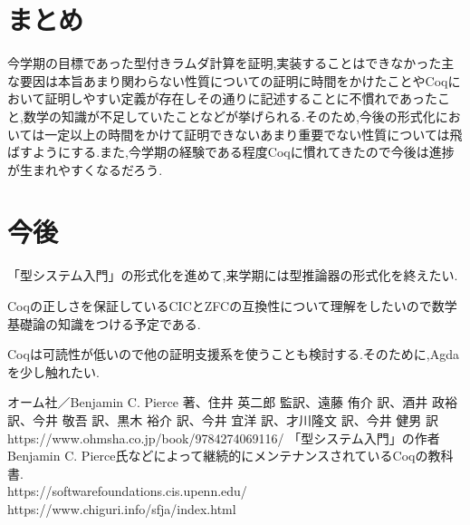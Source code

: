 \documentclass[fleqn,a4j,10pt]{jsarticle}
\begin{document}
\section{まとめ}
今学期の目標であった型付きラムダ計算を証明,実装することはできなかった主な要因は本旨あまり関わらない性質についての証明に時間をかけたことやCoqにおいて証明しやすい定義が存在しその通りに記述することに不慣れであったこと,数学の知識が不足していたことなどが挙げられる.そのため,今後の形式化においては一定以上の時間をかけて証明できないあまり重要でない性質については飛ばすようにする.また,今学期の経験である程度Coqに慣れてきたので今後は進捗が生まれやすくなるだろう.

\section{今後}
「型システム入門」の形式化を進めて,来学期には型推論器の形式化を終えたい.\par
Coqの正しさを保証しているCICとZFCの互換性について理解をしたいので数学基礎論の知識をつける予定である.\par
Coqは可読性が低いので他の証明支援系を使うことも検討する.そのために,Agdaを少し触れたい.\par

\begin{thebibliography}{}
 オーム社／Benjamin C. Pierce 著、住井 英二郎 監訳、遠藤 侑介 訳、酒井 政裕 訳、今井 敬吾 訳、黒木 裕介 訳、今井 宜洋 訳、才川隆文 訳、今井 健男 訳 https://www.ohmsha.co.jp/book/9784274069116/
 「型システム入門」の作者Benjamin C. Pierce氏などによって継続的にメンテナンスされているCoqの教科書.\\
https://softwarefoundations.cis.upenn.edu/
 https://www.chiguri.info/sfja/index.html
\end{thebibliography}
\end{document}
